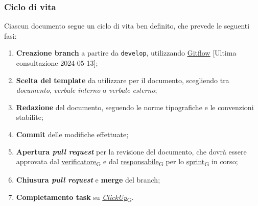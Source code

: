 \subsubsection{Ciclo di vita}
Ciascun documento segue un ciclo di vita ben definito, che prevede le seguenti fasi:
\begin{enumerate}
	\item \textbf{Creazione branch} a partire da \texttt{develop}, utilizzando \href{https://www.atlassian.com/git/tutorials/comparing-workflows/gitflow-workflow}{\underline{Gitflow}} [Ultima consultazione 2024-05-13];
	\item \textbf{Scelta del template} da utilizzare per il documento, scegliendo tra \textit{documento}, \textit{verbale interno} o \textit{verbale esterno};
	\item \textbf{Redazione} del documento, seguendo le norme tipografiche e le convenzioni stabilite;
	\item \textbf{Commit} delle modifiche effettuate;
	\item \textbf{Apertura \textit{pull request}} per la revisione del documento, che dovrà essere approvata dal \href{https://7last.github.io/docs/rtb/documentazione-interna/glossario\#verificatore}{verificatore\textsubscript{G}} e dal \href{https://7last.github.io/docs/rtb/documentazione-interna/glossario\#responsabile}{responsabile\textsubscript{G}} per lo \href{https://7last.github.io/docs/rtb/documentazione-interna/glossario\#sprint}{sprint\textsubscript{G}} in corso;
	\item \textbf{Chiusura \textit{pull request}} e \textbf{merge} del branch;
	\item \textbf{Completamento task} su \href{https://7last.github.io/docs/rtb/documentazione-interna/glossario\#clickup}{\textit{ClickUp}\textsubscript{G}}.
\end{enumerate}

